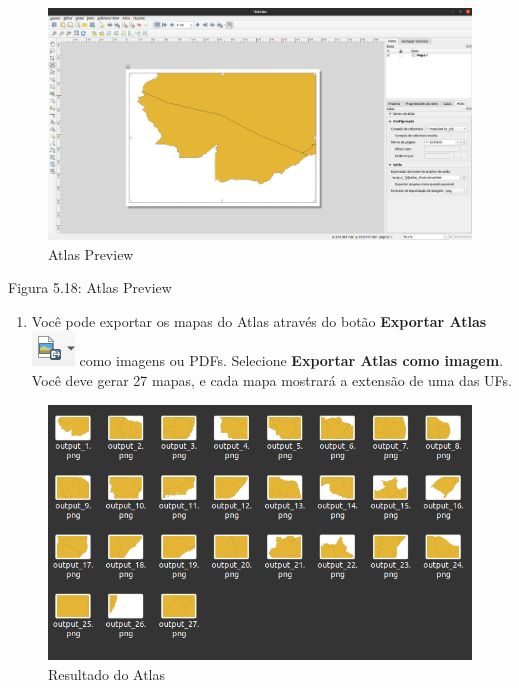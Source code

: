 \documentclass[
]{book}
\providecommand{\tightlist}{%
  \setlength{\itemsep}{0pt}\setlength{\parskip}{0pt}}
\begin{document}
\begin{figure}
\centering
\includegraphics{media/modulo5/atlas-preview.png}
\caption{Atlas Preview}
\end{figure}

Figura 5.18: Atlas Preview

\begin{enumerate}
\def\labelenumi{\arabic{enumi}.}
\setcounter{enumi}{5}
\tightlist
\item
  Você pode exportar os mapas do Atlas através do botão \textbf{Exportar Atlas} \includegraphics{media/modulo5/atlas-export-btn.png} como imagens ou PDFs. Selecione \textbf{Exportar Atlas como imagem}. Você deve gerar 27 mapas, e cada mapa mostrará a extensão de uma das UFs.
\end{enumerate}

\begin{figure}
\centering
\includegraphics{media/modulo5/atlas-outputs.png}
\caption{Resultado do Atlas}
\end{figure}
\end{document}
